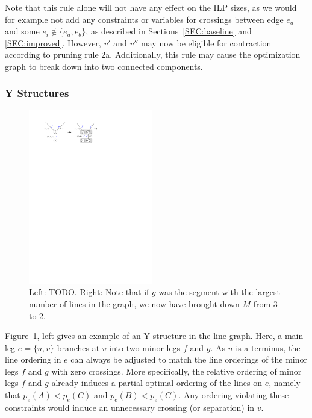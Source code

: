 \documentclass[sigconf]{acmart}
\begin{document}
Note that this rule alone will not have any effect on the ILP sizes, as we would for example not add any constraints or variables for crossings between edge $e_a$ and some $e_i \not\in \{e_a, e_b\}$, as described in Sections~\ref{SEC:baseline} and \ref{SEC:improved}. However, $v'$ and $v''$ may now be eligible for contraction according to pruning rule 2a. Additionally, this rule may cause the optimization graph to break down into two connected components.

\subsubsection{Y Structures}

\begin{figure}
  \centering
  \includegraphics[width=0.48\textwidth]{untangling/y.pdf}
  \caption{Left: TODO. Right: Note that if $g$ was the segment with the largest number of lines in the graph, we now have brought down $M$ from 3 to 2.}  
  \label{FIG:untangle_y}
\end{figure}

Figure~\ref{FIG:untangle_y}, left gives an example of an Y structure in the line graph. Here, a main leg $e = \{u, v\}$ branches at $v$ into two minor legs $f$ and $g$. As $u$ is a terminus, the line ordering in $e$ can always be adjusted to match the line orderings of the minor legs $f$ and $g$ with zero crossings. More specifically, the relative ordering of minor legs $f$ and $g$ already induces a partial optimal ordering of the lines on $e$, namely that $p_e(A) < p_e(C)$ and $p_e(B) < p_e(C)$. Any ordering violating these constraints would induce an unnecessary crossing (or separation) in $v$.
\end{document}
